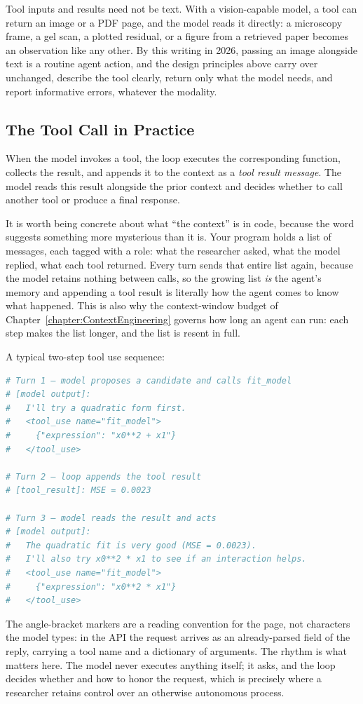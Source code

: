\begin{remark}
Tool inputs and results need not be text.
With a vision-capable model, a tool can return an image or a PDF page, and the model reads it directly: a microscopy frame, a gel scan, a plotted residual, or a figure from a retrieved paper becomes an observation like any other.
By this writing in 2026, passing an image alongside text is a routine agent action, and the design principles above carry over unchanged, describe the tool clearly, return only what the model needs, and report informative errors, whatever the modality.
\end{remark}

\subsection{The Tool Call in Practice}

When the model invokes a tool, the loop executes the corresponding function, collects the result, and appends it to the context as a \emph{tool result message}.
The model reads this result alongside the prior context and decides whether to call another tool or produce a final response.

It is worth being concrete about what ``the context'' is in code, because the word suggests something more mysterious than it is.
Your program holds a list of messages, each tagged with a role: what the researcher asked, what the model replied, what each tool returned.
Every turn sends that entire list again, because the model retains nothing between calls, so the growing list \emph{is} the agent's memory and appending a tool result is literally how the agent comes to know what happened.
This is also why the context-window budget of Chapter~\ref{chapter:ContextEngineering} governs how long an agent can run: each step makes the list longer, and the list is resent in full.

\begin{example}
A typical two-step tool use sequence:
\begin{lstlisting}[language=python]
# Turn 1 — model proposes a candidate and calls fit_model
# [model output]:
#   I'll try a quadratic form first.
#   <tool_use name="fit_model">
#     {"expression": "x0**2 + x1"}
#   </tool_use>

# Turn 2 — loop appends the tool result
# [tool_result]: MSE = 0.0023

# Turn 3 — model reads the result and acts
# [model output]:
#   The quadratic fit is very good (MSE = 0.0023).
#   I'll also try x0**2 * x1 to see if an interaction helps.
#   <tool_use name="fit_model">
#     {"expression": "x0**2 * x1"}
#   </tool_use>
\end{lstlisting}
The angle-bracket markers are a reading convention for the page, not characters the model types: in the API the request arrives as an already-parsed field of the reply, carrying a tool name and a dictionary of arguments.
The rhythm is what matters here.
The model never executes anything itself; it asks, and the loop decides whether and how to honor the request, which is precisely where a researcher retains control over an otherwise autonomous process.
\end{example}

